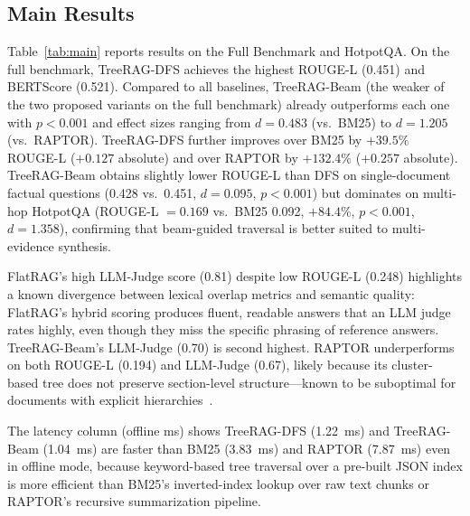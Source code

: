 \documentclass[sigconf,review,anonymous]{acmart}
\begin{document}
\subsection{Main Results}
Table~\ref{tab:main} reports results on the Full Benchmark and HotpotQA.
On the full benchmark, TreeRAG-DFS achieves the highest ROUGE-L (0.451) and
BERTScore (0.521). Compared to all baselines, TreeRAG-Beam (the weaker of the two
proposed variants on the full benchmark) already outperforms each one with
$p<0.001$ and effect sizes ranging from $d=0.483$ (vs.\ BM25) to $d=1.205$ (vs.\
RAPTOR). TreeRAG-DFS further improves over BM25 by $+39.5\%$ ROUGE-L ($+0.127$
absolute) and over RAPTOR by $+132.4\%$ ($+0.257$ absolute). TreeRAG-Beam obtains
slightly lower ROUGE-L than DFS on single-document factual questions (0.428 vs.\
0.451, $d=0.095$, $p<0.001$) but dominates on multi-hop HotpotQA (ROUGE-L $=
0.169$ vs.\ BM25 0.092, $+84.4\%$, $p<0.001$, $d=1.358$), confirming that
beam-guided traversal is better suited to multi-evidence synthesis.

FlatRAG's high LLM-Judge score (0.81) despite low ROUGE-L (0.248) highlights a
known divergence between lexical overlap metrics and semantic quality: FlatRAG's
hybrid scoring produces fluent, readable answers that an LLM judge rates highly,
even though they miss the specific phrasing of reference answers. TreeRAG-Beam's
LLM-Judge (0.70) is second highest. RAPTOR underperforms on both ROUGE-L (0.194)
and LLM-Judge (0.67), likely because its cluster-based tree does not preserve
section-level structure---known to be suboptimal for documents with explicit
hierarchies~\cite{sarthi2024raptor}.

The latency column (offline ms) shows TreeRAG-DFS (1.22~ms) and TreeRAG-Beam
(1.04~ms) are faster than BM25 (3.83~ms) and RAPTOR (7.87~ms) even in offline
mode, because keyword-based tree traversal over a pre-built JSON index is more
efficient than BM25's inverted-index lookup over raw text chunks or RAPTOR's
recursive summarization pipeline.
\end{document}
